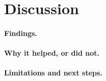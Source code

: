 \section{Discussion}
\label{sec:discussion}

\paragraph{Findings.} \todo{}

\paragraph{Why it helped, or did not.} \todo{}

\paragraph{Limitations and next steps.} \todo{}
